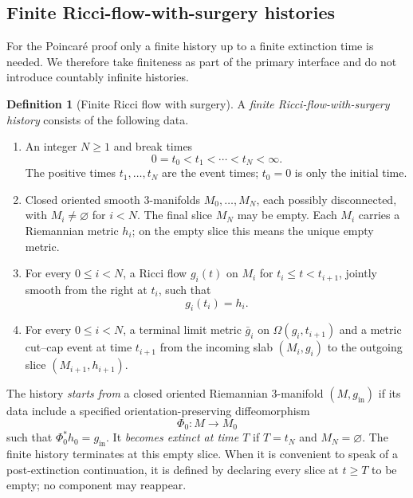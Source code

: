 \documentclass[10pt]{coll-l}
\theoremstyle{definition}
\newtheorem{definition}[theorem]{Definition}
\theoremstyle{remark}
\numberwithin{section}{chapter}
\numberwithin{equation}{chapter}
\begin{document}
\subsection{Finite Ricci-flow-with-surgery histories}

For the Poincar\'e proof only a finite history up to a finite extinction time
is needed.  We therefore take finiteness as part of the primary interface and
do not introduce countably infinite histories.

\begin{definition}[Finite Ricci flow with surgery]
\label{def:finite-surgery-history}
A \emph{finite Ricci-flow-with-surgery history} consists of the following
data.

\begin{enumerate}
\item An integer $N\geq1$ and break times
\[
  0=t_{0}<t_{1}<\cdots<t_{N}<\infty.
\]
The positive times $t_{1},\ldots,t_{N}$ are the event times; $t_{0}=0$ is
only the initial time.

\item Closed oriented smooth $3$-manifolds
$M_{0},\ldots,M_{N}$, each possibly disconnected, with
$M_{i}\neq\varnothing$ for $i<N$.  The final slice $M_{N}$ may be empty.
Each $M_i$ carries a Riemannian metric $h_i$; on the empty slice this means
the unique empty metric.

\item For every $0\leq i<N$, a Ricci flow $g_i(t)$ on $M_i$ for
$t_i\leq t<t_{i+1}$, jointly smooth from the right at $t_i$, such that
\[
  g_i(t_i)=h_i.
\]

\item For every $0\leq i<N$, a terminal limit metric $\bar g_i$ on
$\Omega(g_i,t_{i+1})$ and a metric cut--cap event at time $t_{i+1}$ from
the incoming slab $(M_i,g_i)$ to the outgoing slice
$(M_{i+1},h_{i+1})$.
\end{enumerate}

The history \emph{starts from} a closed oriented Riemannian $3$-manifold
$(M,g_{\mathrm{in}})$ if its data include a specified
orientation-preserving diffeomorphism
\[
  \Phi_{0}\colon M\longrightarrow M_{0}
\]
such that $\Phi_{0}^{*}h_{0}=g_{\mathrm{in}}$.
It \emph{becomes extinct at time $T$} if $T=t_N$ and
$M_N=\varnothing$.  The finite history terminates at this empty slice.  When
it is convenient to speak of a post-extinction continuation, it is defined
by declaring every slice at $t\geq T$ to be empty; no component may reappear.
\end{definition}
\end{document}
